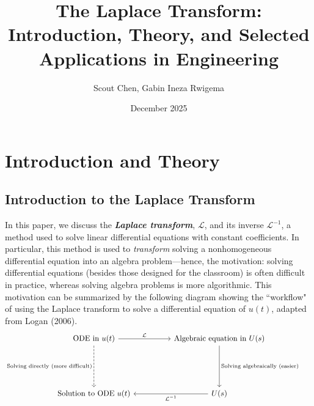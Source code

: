 \documentclass[12pt]{article}
\title{The Laplace Transform: Introduction, Theory, and Selected Applications in Engineering}
\author{Scout Chen,  
Gabin Ineza Rwigema}
\date{December 2025}
\theoremstyle{plain}
\theoremstyle{definition}
\begin{document}
\maketitle
\tableofcontents
\newpage

\section{Introduction and Theory}
\subsection{Introduction to the Laplace Transform}
In this paper, we discuss the \emph{\textbf{Laplace transform}}, $\mathcal{L}$, and its inverse $\mathcal{L}^{-1}$, a method used to solve linear differential equations with constant coefficients. In particular, this method is used to \emph{transform} solving a nonhomogeneous differential equation into an algebra problem---hence, the motivation: solving differential equations (besides those designed for the classroom) is often difficult in practice, whereas solving algebra problems is more algorithmic. This motivation can be summarized by the following diagram showing the ``workflow" of using the Laplace transform to solve a differential equation of $u(t)$, adapted from Logan (2006).
\[\begin{tikzcd}
	{\text{ODE in } u(t)} && {\text{Algebraic equation in } U(s)} && {} \\
	\\
	\\
	{\text{Solution to ODE }u(t)} && {U(s)}
	\arrow["{\mathcal{L}}", from=1-1, to=1-3]
	\arrow["{\text{Solving directly (more difficult)}}"', dashed, from=1-1, to=4-1]
	\arrow["{\text{Solving algebraically (easier)}}", from=1-3, to=4-3]
	\arrow["{\mathcal{L}^{-1}}", from=4-3, to=4-1]
\end{tikzcd}\]
\end{document}
